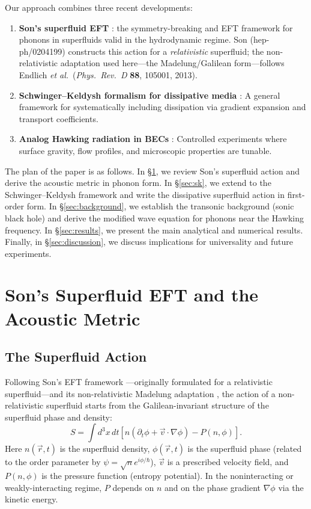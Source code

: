 \documentclass[aps,prl,twocolumn,superscriptaddress,nofootinbib,amsmath,amssymb]{revtex4-2}
\begin{document}
Our approach combines three recent developments:
\begin{enumerate}
\item \textbf{Son's superfluid EFT} \cite{Son2002}: the symmetry-breaking and EFT framework for phonons in superfluids valid in the hydrodynamic regime. Son (hep-ph/0204199) constructs this action for a \emph{relativistic} superfluid; the non-relativistic adaptation used here---the Madelung/Galilean form---follows Endlich \textit{et al.}~(\emph{Phys.\ Rev.\ D} \textbf{88}, 105001, 2013).
\item \textbf{Schwinger--Keldysh formalism for dissipative media} \cite{Crossley2017,Jana2020}: A general framework for systematically including dissipation via gradient expansion and transport coefficients.
\item \textbf{Analog Hawking radiation in BECs} \cite{Coutant2014,Steinhauer2019}: Controlled experiments where surface gravity, flow profiles, and microscopic properties are tunable.
\end{enumerate}

The plan of the paper is as follows. In \S\ref{sec:son}, we review Son's superfluid action and derive the acoustic metric in phonon form. In \S\ref{sec:sk}, we extend to the Schwinger--Keldysh framework and write the dissipative superfluid action in first-order form. In \S\ref{sec:background}, we establish the transonic background (sonic black hole) and derive the modified wave equation for phonons near the Hawking frequency. In \S\ref{sec:results}, we present the main analytical and numerical results. Finally, in \S\ref{sec:discussion}, we discuss implications for universality and future experiments.

\section{Son's Superfluid EFT and the Acoustic Metric}
\label{sec:son}

\subsection{The Superfluid Action}

Following Son's EFT framework \cite{Son2002}---originally formulated for
a relativistic superfluid---and its non-relativistic Madelung adaptation
\cite{Son2002}, the action of a non-relativistic superfluid starts from the
Galilean-invariant structure of the superfluid phase and density:
\begin{equation}
\label{eq:son_action}
S = \int d^3 x \, dt \left[ n(\partial_t \phi + \vec{v} \cdot \nabla \phi) - P(n, \phi) \right].
\end{equation}
Here $n(\vec{r}, t)$ is the superfluid density, $\phi(\vec{r}, t)$ is the superfluid phase (related to the order parameter by $\psi = \sqrt{n} e^{i\phi/\hbar}$), $\vec{v}$ is a prescribed velocity field, and $P(n, \phi)$ is the pressure function (entropy potential). In the noninteracting or weakly-interacting regime, $P$ depends on $n$ and on the phase gradient $\nabla\phi$ via the kinetic energy.
\end{document}
